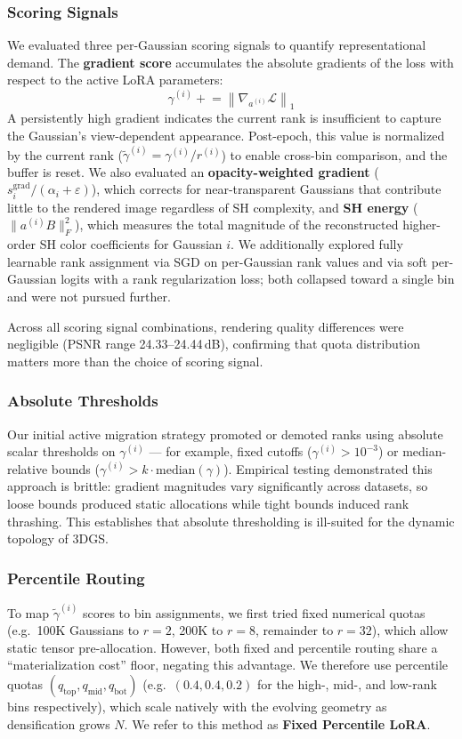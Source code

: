 \documentclass[sigconf]{acmart}
\begin{document}
\subsubsection{Scoring Signals}
We evaluated three per-Gaussian scoring signals to quantify representational
demand. The \textbf{gradient score} accumulates the absolute gradients of the
loss with respect to the active LoRA parameters:
\begin{equation}
  \gamma^{(i)} \mathrel{+}= \left\| \nabla_{a^{(i)}} \mathcal{L} \right\|_1
\end{equation}
A persistently high gradient indicates the current rank is insufficient to
capture the Gaussian's view-dependent appearance. Post-epoch, this value is
normalized by the current rank ($\tilde{\gamma}^{(i)} = \gamma^{(i)} / r^{(i)}$)
to enable cross-bin comparison, and the buffer is reset. We also evaluated an
\textbf{opacity-weighted gradient} ($s_i^{\text{grad}} / (\alpha_i +
\varepsilon)$), which corrects for near-transparent Gaussians that contribute
little to the rendered image regardless of SH complexity, and \textbf{SH
energy} ($\|a^{(i)} B\|_F^2$), which measures the total magnitude of the
reconstructed higher-order SH color coefficients for Gaussian $i$. We
additionally explored fully learnable rank assignment via SGD on per-Gaussian
rank values and via soft per-Gaussian logits with a rank regularization loss;
both collapsed toward a single bin and were not pursued further.

Across all scoring signal combinations, rendering quality differences were
negligible (PSNR range 24.33--24.44\,dB), confirming that quota distribution
matters more than the choice of scoring signal.

\subsubsection{Absolute Thresholds}
Our initial active migration strategy promoted or demoted ranks using absolute
scalar thresholds on $\gamma^{(i)}$ --- for example, fixed cutoffs
($\gamma^{(i)} > 10^{-3}$) or median-relative bounds
($\gamma^{(i)} > k \cdot \text{median}(\gamma)$). Empirical testing
demonstrated this approach is brittle: gradient magnitudes vary significantly
across datasets, so loose bounds produced static allocations while tight bounds
induced rank thrashing. This establishes that absolute thresholding is
ill-suited for the dynamic topology of 3DGS.

\subsubsection{Percentile Routing}
To map $\tilde{\gamma}^{(i)}$ scores to bin assignments, we first tried fixed
numerical quotas (e.g.\ 100K Gaussians to $r=2$, 200K to $r=8$, remainder to
$r=32$), which allow static tensor pre-allocation. However, both fixed and
percentile routing share a ``materialization cost'' floor, negating this
advantage. We therefore use percentile quotas $(q_{\text{top}}, q_{\text{mid}},
q_{\text{bot}})$ (e.g.\ $(0.4, 0.4, 0.2)$ for the high-, mid-, and
low-rank bins respectively), which scale natively with the evolving geometry
as densification grows $N$. We refer to this method as \textbf{Fixed Percentile LoRA}.
\end{document}
